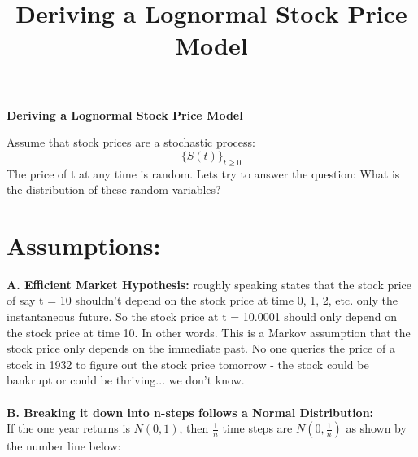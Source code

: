 \documentclass{article}
\begin{document}
\begin{title}
\centering

 
\LARGE\textbf{Deriving a Lognormal Stock Price Model}

\bigskip
    

\end{title}
\title{Deriving a Lognormal Stock Price Model}

Assume that stock prices are a stochastic process: $$\{S(t)\}_{t\geq0}$$ The price of t at any time is random. Lets try to answer the question: What is the distribution of these random variables? \\
\section{\textbf{Assumptions:}}


\textbf{A. Efficient Market Hypothesis:} roughly speaking states that the stock price of say t = 10 shouldn't depend on the stock price at time 0, 1, 2, etc. only the instantaneous future. So the stock price at t = 10.0001 should only depend on the stock price at time 10. In other words. This is a Markov assumption that the stock price only depends on the immediate past. 
No one queries the price of a stock in 1932 to figure out the stock price tomorrow - the stock could be bankrupt or could be thriving... we don't know. \\
\\ \textbf{B. Breaking it down into n-steps follows a Normal Distribution:}\\ If the one year returns is $N(0,1)$, then $\frac{1}{n}$ time steps are $N(0,\frac{1}{n})$ as shown by the number line below: 
    \\
\\
\\
\end{document}
